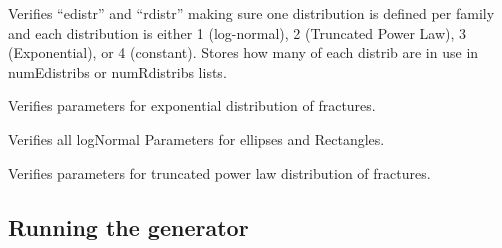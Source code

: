 \documentclass[letterpaper,10pt,english]{sphinxmanual}
\begin{document}
\begin{fulllineitems}
\begin{fulllineitems}
\end{fulllineitems}


\begin{fulllineitems}
\label{pydfnworks:pydfnworks.distributions.distr.distr}
Verifies ``edistr'' and ``rdistr'' making sure one distribution is defined per family and
each distribution is either 1 (log-normal), 2 (Truncated Power Law), 3 (Exponential), or 4 (constant).
Stores how many of each distrib are in use in numEdistribs or numRdistribs lists.

\end{fulllineitems}


\begin{fulllineitems}
\label{pydfnworks:pydfnworks.distributions.distr.exponentialDist}
Verifies parameters for exponential distribution of fractures.

\end{fulllineitems}


\begin{fulllineitems}
\label{pydfnworks:pydfnworks.distributions.distr.lognormalDist}
Verifies all logNormal Parameters for ellipses and Rectangles.

\end{fulllineitems}


\begin{fulllineitems}
\label{pydfnworks:pydfnworks.distributions.distr.tplDist}
Verifies parameters for truncated power law distribution of fractures.

\end{fulllineitems}


\end{fulllineitems}



\subsection{Running the generator}
\label{pydfnworks:running-the-generator}\label{pydfnworks:module-pydfnworks.generator}
\end{document}
